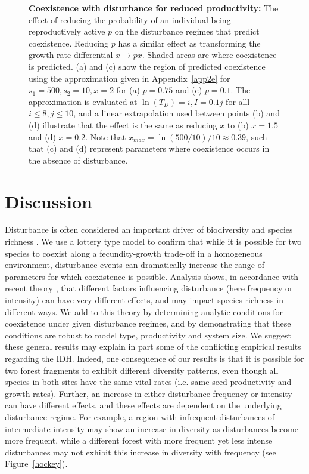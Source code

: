 \begin{figure}[htbp]
\begin{center}
\caption[Coexistence with disturbance for reduced productivity]{\textbf{Coexistence with disturbance for reduced productivity:} The effect of reducing the probability of an individual being reproductively active $p$ on the disturbance regimes that predict coexistence. Reducing $p$ has a similar effect as transforming the growth rate differential $x \to px$. Shaded areas are where coexistence is predicted. (a) and (c) show the region of predicted coexistence using the approximation given in Appendix~\ref{app2e} for $s_1=500,s_2=10,x=2$ for (a) $p=0.75$ and (c) $p=0.1$. The approximation is evaluated at $\ln(T_D)=i, I=0.1j$ for alll $i\leq8, j\leq 10$, and a linear extrapolation used between points (b) and (d) illustrate that the effect is the same as reducing $x$ to (b) $x=1.5$ and (d) $x=0.2$. Note that $x_{max}=\ln(500/10)/10\approx 0.39$, such that (c) and (d) represent parameters where coexistence occurs in the absence of disturbance.}
\label{pfigure}
\end{center}
\end{figure}


\section{Discussion} \label{discuss}
Disturbance is often considered an important driver of biodiversity and species richness \citep[e.g.][]{denslow1987tropical,lawton1988natural,sousa1984role}. We use a lottery type model to confirm that while it is possible for two species to coexist along a fecundity-growth trade-off in a homogeneous environment, disturbance events can dramatically increase the range of parameters for which coexistence is possible. Analysis shows, in accordance with recent theory \citep{miller2011frequency}, that different factors influencing disturbance (here frequency or intensity) can have very different effects, and may impact species richness in different ways. We add to this theory by determining analytic conditions for coexistence under given disturbance regimes, and by demonstrating that these conditions are robust to model type, productivity and system size. We suggest these general results may explain in part some of the conflicting empirical results regarding the IDH. Indeed, one consequence of our results is that it is possible for two forest fragments to exhibit different diversity patterns, even though all species in both sites have the same vital rates (i.e. same seed productivity and growth rates). Further, an increase in either disturbance frequency or intensity can have different effects, and these effects are dependent on the underlying disturbance regime. For example, a region with infrequent disturbances of intermediate intensity may show an increase in diversity as disturbances become more frequent, while a different forest with more frequent yet less intense disturbances may not exhibit this increase in diversity with frequency (see Figure~\ref{hockey}).

